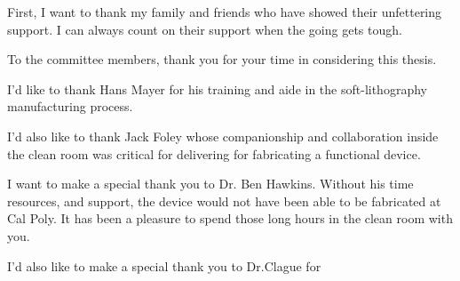 
\mbox

\\
\par First, I want to thank my family and friends who have showed their unfettering support. I can always count on their support when the going gets tough.

\vfill

\par To the committee members, thank you for your time in considering this thesis.  

\vfill

\par I'd like to thank Hans Mayer for his training and aide in the soft-lithography manufacturing process.

\vfill

\par I'd also like to thank Jack Foley whose companionship and collaboration inside the clean room was critical for delivering for fabricating a functional device. 

\vfill

\par I want to make a special thank you to Dr. Ben Hawkins. Without his time resources, and support, the device would not have been able to be fabricated at Cal Poly. It has been a pleasure to spend those long hours in the clean room with you.

\vfill

\par I'd also like to make a special thank you to Dr.Clague for
\\
